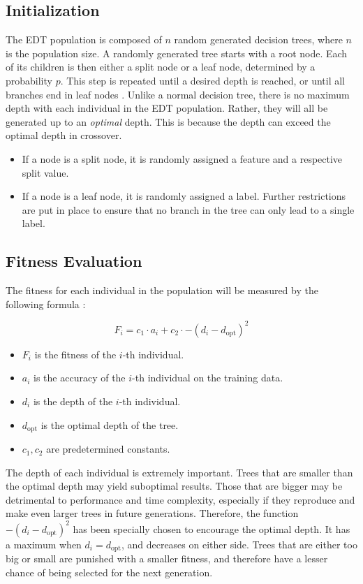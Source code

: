 \documentclass[12pt]{article}
\begin{document}
\subsection{Initialization}

The EDT population is composed of $n$ random generated decision trees, where $n$ is the population size. A randomly generated tree starts with a root node. Each of its children is then either a split node or a leaf node, determined by a probability $p$. This step is repeated until a desired depth is reached, or until all branches end in leaf nodes \cite{faik_2020}. Unlike a normal decision tree, there is no maximum depth with each individual in the EDT population. Rather, they will all be generated up to an \textit{optimal} depth. This is because the depth can exceed the optimal depth in crossover.

\begin{itemize}
    \item If a node is a split node, it is randomly assigned a feature and a respective split value.
    \item If a node is a leaf node, it is randomly assigned a label. Further restrictions are put in place to ensure that no branch in the tree can only lead to a single label.
\end{itemize}

\subsection{Fitness Evaluation}

The fitness for each individual in the population will be measured by the following formula \cite{faik_2020}:

\[ F_i = c_1 \cdot a_i + c_2 \cdot -(d_i - d_\text{opt})^2 \]

\begin{itemize}
    \item $F_i$ is the fitness of the $i$-th individual.
    \item $a_i$ is the accuracy of the $i$-th individual on the training data.
    \item $d_i$ is the depth of the $i$-th individual.
    \item $d_\text{opt}$ is the optimal depth of the tree.
    \item $c_1, c_2$ are predetermined constants.
\end{itemize}

The depth of each individual is extremely important. Trees that are smaller than the optimal depth may yield suboptimal results. Those that are bigger may be detrimental to performance and time complexity, especially if they reproduce and make even larger trees in future generations. Therefore, the function $-(d_i - d_\text{opt})^2$ has been specially chosen to encourage the optimal depth. It has a maximum when $d_i = d_\text{opt}$, and decreases on either side. Trees that are either too big or small are punished with a smaller fitness, and therefore have a lesser chance of being selected for the next generation.
\end{document}
